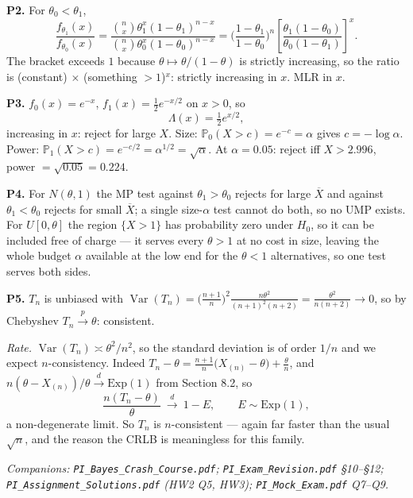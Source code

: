 \documentclass[11pt]{article}
\newcommand{\Var}{\operatorname{Var}}
\newcommand{\Prob}{\mathbb{P}}
\newcommand{\Xbar}{\overline{X}}
\newcommand{\pto}{\overset{p}{\longrightarrow}}
\newcommand{\dto}{\overset{d}{\longrightarrow}}
\begin{document}
\smallskip
\noindent\textbf{P2.} For $\theta_0<\theta_1$,
\[
\frac{f_{\theta_1}(x)}{f_{\theta_0}(x)}
=\frac{\binom nx\theta_1^{x}(1-\theta_1)^{n-x}}{\binom nx\theta_0^{x}(1-\theta_0)^{n-x}}
=\Big(\frac{1-\theta_1}{1-\theta_0}\Big)^{n}
\left[\frac{\theta_1(1-\theta_0)}{\theta_0(1-\theta_1)}\right]^{x}.
\]
The bracket exceeds $1$ because $\theta\mapsto\theta/(1-\theta)$ is strictly increasing, so the
ratio is (constant) $\times$ (something $>1$)$^{x}$: strictly increasing in $x$. MLR in $x$.
\checkmark

\smallskip
\noindent\textbf{P3.} $f_0(x)=e^{-x}$, $f_1(x)=\tfrac12e^{-x/2}$ on $x>0$, so
\[
\Lambda(x)=\tfrac12 e^{x/2},
\]
increasing in $x$: reject for large $X$. Size: $\Prob_0(X>c)=e^{-c}=\alpha$ gives
$c=-\log\alpha$. Power: $\Prob_1(X>c)=e^{-c/2}=\alpha^{1/2}=\sqrt\alpha$.
At $\alpha=0.05$: reject iff $X>2.996$, power $=\sqrt{0.05}=0.224$.

\smallskip
\noindent\textbf{P4.} For $N(\theta,1)$ the MP test against $\theta_1>\theta_0$ rejects for
large $\Xbar$ and against $\theta_1<\theta_0$ rejects for small $\Xbar$; a single size-$\alpha$
test cannot do both, so no UMP exists. For $U[0,\theta]$ the region $\{X>1\}$ has probability
zero under $H_0$, so it can be included free of charge --- it serves every $\theta>1$ at no
cost in size, leaving the whole budget $\alpha$ available at the low end for the $\theta<1$
alternatives, so one test serves both sides.

\smallskip
\noindent\textbf{P5.} $T_n$ is unbiased with
$\Var(T_n)=\big(\tfrac{n+1}{n}\big)^2\tfrac{n\theta^2}{(n+1)^2(n+2)}=\tfrac{\theta^2}{n(n+2)}\to0$,
so by Chebyshev $T_n\pto\theta$: consistent.

\emph{Rate.} $\Var(T_n)\asymp\theta^2/n^2$, so the standard deviation is of order $1/n$ and we
expect $n$-consistency. Indeed $T_n-\theta=\frac{n+1}{n}\big(X_{(n)}-\theta\big)+\frac\theta n$,
and $n(\theta-X_{(n)})/\theta\dto\mathrm{Exp}(1)$ from Section 8.2, so
\[
\frac{n(T_n-\theta)}{\theta}\ \dto\ 1-E,\qquad E\sim\mathrm{Exp}(1),
\]
a non-degenerate limit. So $T_n$ is $n$-consistent --- again far faster than the usual
$\sqrt n$, and the reason the CRLB is meaningless for this family.

\vfill
\begin{center}
\small\itshape
Companions: \texttt{PI\_Bayes\_Crash\_Course.pdf};
\texttt{PI\_Exam\_Revision.pdf} \S10--\S12;
\texttt{PI\_Assignment\_Solutions.pdf} (HW2 Q5, HW3);
\texttt{PI\_Mock\_Exam.pdf} Q7--Q9.
\end{center}
\end{document}
